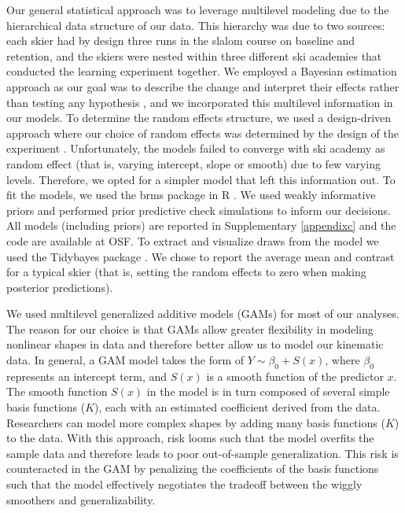 \documentclass{article}
\begin{document}
Our general statistical approach was to leverage multilevel modeling due to the hierarchical data structure of our data. This hierarchy was due to two sources: each skier had by design three runs in the slalom course on baseline and retention, and the skiers were nested within three different ski academies that conducted the learning experiment together. We employed a Bayesian estimation approach as our goal was to describe the change and interpret their effects rather than testing any hypothesis \cite{kruschke_bayesian_2018}, and we incorporated this multilevel information in our models. To determine the random effects structure, we used a design-driven approach where our choice of random effects was determined by the design of the experiment \cite{barr_learning_2021, barr_random_2013}. Unfortunately, the models failed to converge with ski academy as random effect (that is, varying intercept, slope or smooth) due to few varying levels. Therefore, we opted for a simpler model that left this information out. To fit the models, we used the brms \cite{burkner_brms_2017} package in R \cite{r_core_team_r_2022}. We used weakly informative priors and performed prior predictive check simulations to inform our decisions. All models (including priors) are reported in Supplementary \ref{appendixc} and the code are available at OSF. To extract and visualize draws from the model we used the Tidybayes package \cite{kay_tidybayes_nodate}. We chose to report the average mean and contrast for a typical skier (that is, setting the random effects to zero when making posterior predictions). 

We used multilevel generalized additive models (GAMs) \cite{pedersen_hierarchical_2019, wood_generalized_2017} for most of our analyses. The reason for our choice is that GAMs allow greater flexibility in modeling nonlinear shapes in data and therefore better allow us to model our kinematic data. In general, a GAM model takes the form of $Y \sim \beta_0 + S(x)$, where $\beta_0$ represents an intercept term, and $S(x)$ is a smooth function of the predictor $x$. The smooth function $S(x)$ in the model is in turn composed of several simple basis functions ($K$), each with an estimated coefficient derived from the data. Researchers can model more complex shapes by adding many basis functions ($K$) to the data. With this approach, risk looms such that the model overfits the sample data and therefore leads to poor out-of-sample generalization. This risk is counteracted in the GAM by penalizing the coefficients of the basis functions such that the model effectively negotiates the tradeoff between the wiggly smoothers and generalizability. 
\end{document}
